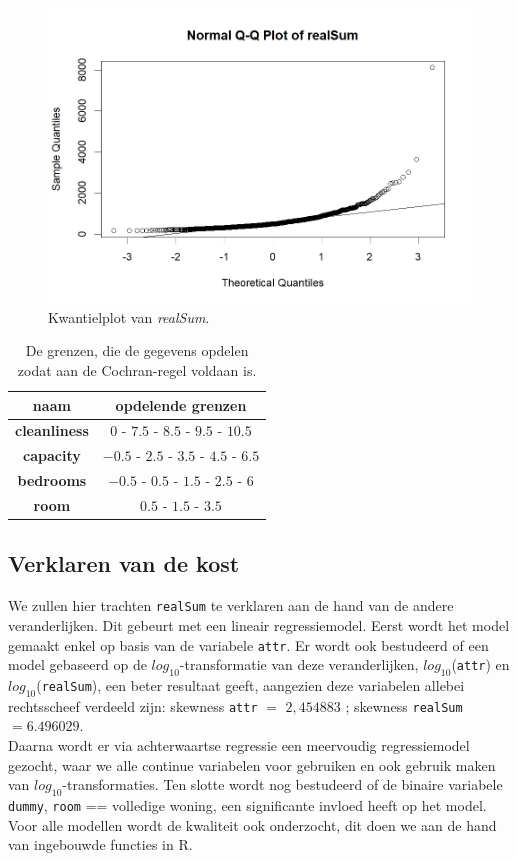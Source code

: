 \documentclass[a4paper]{kulakarticle}
\begin{document}
	\begin{figure}
		\centering
		\includegraphics[width=0.7\linewidth]{Figuren/qqplotvrealSum}
		\caption{Kwantielplot van \textit{realSum}.}
		\label{fig:qqplotvrealsum}
	\end{figure}

	\begin{table}[h]
		\centering
			\begin{tabular}{c|c}
			\centering
			naam& opdelende grenzen\\
			\hline
			\textbf{cleanliness} & $ 0 $ - $ 7.5 $ - $ 8.5$ - $ 9.5 $ - $ 10.5$ \\
			\textbf{capacity}& $-0.5$ - $2.5$ - $3.5$ - $4.5$ - $6.5$\\
			\textbf{bedrooms}& $-0.5$ - $0.5$ - $1.5$ - $2.5$ - $6$\\
			\textbf{room} & $0.5$ - $1.5$ - $3.5$\\
			\end{tabular}
			\caption{De grenzen, die de gegevens opdelen zodat aan de Cochran-regel voldaan is.}
			\label{tab:grenzen}
	\end{table}
	\subsection{Verklaren van de kost}
	
	We zullen hier trachten \verb|realSum| te verklaren aan de hand van de andere veranderlijken. Dit gebeurt met een lineair regressiemodel. Eerst wordt het model gemaakt enkel op basis van de variabele \verb|attr|. Er wordt ook bestudeerd of een model gebaseerd op de $log_{10}$-transformatie van deze veranderlijken, $log_{10}$(\verb|attr|) en $log_{10}$(\verb|realSum|), een beter resultaat geeft, aangezien deze variabelen allebei rechtsscheef verdeeld zijn: skewness \verb|attr| $=$ $2,454883$ ; skewness \verb|realSum| $=6.496029$.\\
	Daarna wordt er via achterwaartse regressie een meervoudig regressiemodel gezocht, waar we alle continue variabelen voor gebruiken en ook gebruik maken van  $log_{10}$-transformaties. Ten slotte wordt nog bestudeerd of de binaire variabele \verb|dummy|, \verb|room| == volledige woning, een significante invloed heeft op het model. Voor alle modellen wordt de kwaliteit ook onderzocht, dit doen we aan de hand van ingebouwde functies in R. 
	
\end{document}
